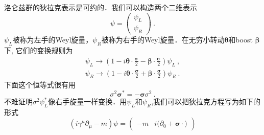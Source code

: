 
洛仑兹群的狄拉克表示是可约的．我们可以构造两个二维表示
\begin{equation}
\psi = \begin{pmatrix}
\psi_L \\
\psi_R
\end{pmatrix}~.
\end{equation}
$\psi_L$被称为左手的Weyl旋量，$\psi_R$被称为右手的Weyl旋量．在无穷小转动$\mathbf \theta$和boost $\mathbf \beta$下, 它们的变换规则为
\begin{align}
\psi_L \rightarrow (1-i \boldsymbol \theta \cdot \frac{\boldsymbol \sigma}{2} - \boldsymbol \beta \cdot \frac{\boldsymbol \sigma}{2})\psi_L ~, \\
\psi_R \rightarrow (1-i\boldsymbol \theta \cdot \frac{\boldsymbol \sigma}{2}+ \boldsymbol \beta \cdot \frac{\boldsymbol \sigma}{2})\psi_R ~.
\end{align}
下面这个恒等式很有用
\begin{equation}
\sigma^2\boldsymbol \sigma^* = - \boldsymbol \sigma \sigma^2~.
\end{equation}
不难证明$\sigma^2\psi^*_L$像右手旋量一样变换．用$\psi_L$和$\psi_R$,我们可以把狄拉克方程写为如下的形式
\begin{equation}
(i\gamma^\mu\partial_\mu - m)\psi = \begin{pmatrix}
- m & i (\partial_0+\boldsymbol \sigma \cdot \boldsymbol)
\end{pmatrix}
\end{equation}